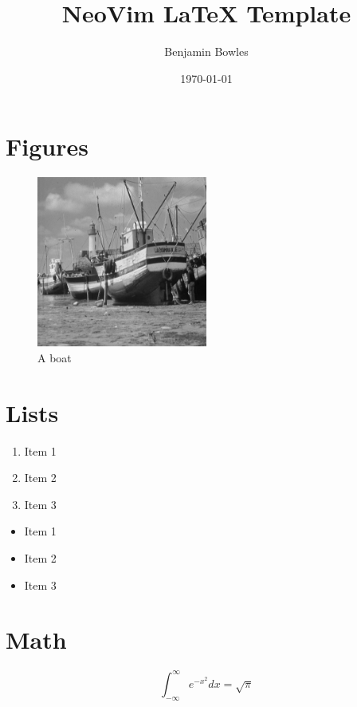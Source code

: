 \documentclass[12pt]{article}
\title{NeoVim LaTeX Template}
\author{Benjamin Bowles}
\date{\today}
\begin{document}
\maketitle
\newpage

\tableofcontents
\newpage

\section{Figures}
\begin{figure}[ht]

\centering
\includegraphics[width=0.5\textwidth]{figs/boat.png}
\caption{A boat}

\end{figure}
\newpage

\section{Lists}
\begin{enumerate}
    \item  Item 1
    \item  Item 2
    \item  Item 3
\end{enumerate}
\begin{itemize}
    \item  Item 1
    \item  Item 2
    \item  Item 3
\end{itemize}
\newpage

\section{Math}
\begin{equation}
    \int_{-\infty}^{\infty} e^{-x^2} dx = \sqrt{\pi}
\end{equation}
\newpage
\end{document}
